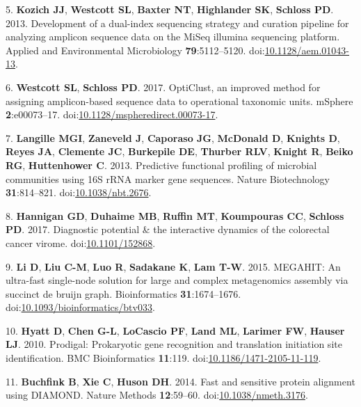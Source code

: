 \documentclass[11pt,]{article}
\begin{document}
\hypertarget{ref-Kozich2013}{}
5. \textbf{Kozich JJ}, \textbf{Westcott SL}, \textbf{Baxter NT},
\textbf{Highlander SK}, \textbf{Schloss PD}. 2013. Development of a
dual-index sequencing strategy and curation pipeline for analyzing
amplicon sequence data on the MiSeq illumina sequencing platform.
Applied and Environmental Microbiology \textbf{79}:5112--5120.
doi:\href{https://doi.org/10.1128/aem.01043-13}{10.1128/aem.01043-13}.

\hypertarget{ref-opticlust_westcott2017}{}
6. \textbf{Westcott SL}, \textbf{Schloss PD}. 2017. OptiClust, an
improved method for assigning amplicon-based sequence data to
operational taxonomic units. mSphere \textbf{2}:e00073--17.
doi:\href{https://doi.org/10.1128/mspheredirect.00073-17}{10.1128/mspheredirect.00073-17}.

\hypertarget{ref-Langille2013}{}
7. \textbf{Langille MGI}, \textbf{Zaneveld J}, \textbf{Caporaso JG},
\textbf{McDonald D}, \textbf{Knights D}, \textbf{Reyes JA},
\textbf{Clemente JC}, \textbf{Burkepile DE}, \textbf{Thurber RLV},
\textbf{Knight R}, \textbf{Beiko RG}, \textbf{Huttenhower C}. 2013.
Predictive functional profiling of microbial communities using 16S rRNA
marker gene sequences. Nature Biotechnology \textbf{31}:814--821.
doi:\href{https://doi.org/10.1038/nbt.2676}{10.1038/nbt.2676}.

\hypertarget{ref-Hannigan2017}{}
8. \textbf{Hannigan GD}, \textbf{Duhaime MB}, \textbf{Ruffin MT},
\textbf{Koumpouras CC}, \textbf{Schloss PD}. 2017. Diagnostic potential
\& the interactive dynamics of the colorectal cancer virome.
doi:\href{https://doi.org/10.1101/152868}{10.1101/152868}.

\hypertarget{ref-Li2015}{}
9. \textbf{Li D}, \textbf{Liu C-M}, \textbf{Luo R}, \textbf{Sadakane K},
\textbf{Lam T-W}. 2015. MEGAHIT: An ultra-fast single-node solution for
large and complex metagenomics assembly via succinct de bruijn graph.
Bioinformatics \textbf{31}:1674--1676.
doi:\href{https://doi.org/10.1093/bioinformatics/btv033}{10.1093/bioinformatics/btv033}.

\hypertarget{ref-Hyatt2010}{}
10. \textbf{Hyatt D}, \textbf{Chen G-L}, \textbf{LoCascio PF},
\textbf{Land ML}, \textbf{Larimer FW}, \textbf{Hauser LJ}. 2010.
Prodigal: Prokaryotic gene recognition and translation initiation site
identification. BMC Bioinformatics \textbf{11}:119.
doi:\href{https://doi.org/10.1186/1471-2105-11-119}{10.1186/1471-2105-11-119}.

\hypertarget{ref-Buchfink2014}{}
11. \textbf{Buchfink B}, \textbf{Xie C}, \textbf{Huson DH}. 2014. Fast
and sensitive protein alignment using DIAMOND. Nature Methods
\textbf{12}:59--60.
doi:\href{https://doi.org/10.1038/nmeth.3176}{10.1038/nmeth.3176}.
\end{document}
